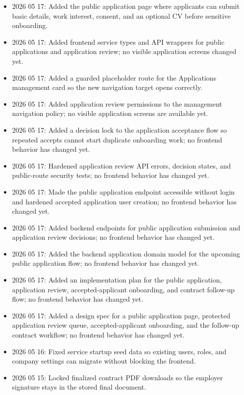 \documentclass[11pt]{article}
\begin{document}
\begin{itemize}
    \item 2026 05 17: Added the public application page where applicants can submit basic details, work interest, consent, and an optional CV before sensitive onboarding.
    \item 2026 05 17: Added frontend service types and API wrappers for public applications and application review; no visible application screens changed yet.
    \item 2026 05 17: Added a guarded placeholder route for the Applications management card so the new navigation target opens correctly.
    \item 2026 05 17: Added application review permissions to the management navigation policy; no visible application screens are available yet.
    \item 2026 05 17: Added a decision lock to the application acceptance flow so repeated accepts cannot start duplicate onboarding work; no frontend behavior has changed yet.
    \item 2026 05 17: Hardened application review API errors, decision states, and public-route security tests; no frontend behavior has changed yet.
    \item 2026 05 17: Made the public application endpoint accessible without login and hardened accepted application user creation; no frontend behavior has changed yet.
    \item 2026 05 17: Added backend endpoints for public application submission and application review decisions; no frontend behavior has changed yet.
    \item 2026 05 17: Added the backend application domain model for the upcoming public application flow; no frontend behavior has changed yet.
    \item 2026 05 17: Added an implementation plan for the public application, application review, accepted-applicant onboarding, and contract follow-up flow; no frontend behavior has changed yet.
    \item 2026 05 17: Added a design spec for a public application page, protected application review queue, accepted-applicant onboarding, and the follow-up contract workflow; no frontend behavior has changed yet.
    \item 2026 05 16: Fixed service startup seed data so existing users, roles, and company settings can migrate without blocking the frontend.
    \item 2026 05 15: Locked finalized contract PDF downloads so the employer signature stays in the stored final document.

\end{itemize}
\end{document}
